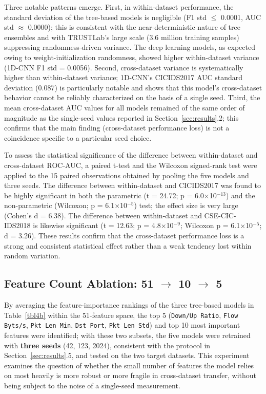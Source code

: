 \documentclass[a4paper,fleqn]{cas-sc}
\begin{document}
Three notable patterns emerge. First, in within-dataset performance, the standard deviation of the tree-based models is negligible (F1 std $\leq$ 0.0001, AUC std $\approx$ 0.0000); this is consistent with the near-deterministic nature of tree ensembles and with TRUSTLab's large scale (3.6 million training samples) suppressing randomness-driven variance. The deep learning models, as expected owing to weight-initialization randomness, showed higher within-dataset variance (1D-CNN F1 std = 0.0056). Second, cross-dataset variance is systematically higher than within-dataset variance; 1D-CNN's CICIDS2017 AUC standard deviation (0.087) is particularly notable and shows that this model's cross-dataset behavior cannot be reliably characterized on the basis of a single seed. Third, the mean cross-dataset AUC values for all models remained of the same order of magnitude as the single-seed values reported in Section~\ref{sec:results}.2; this confirms that the main finding (cross-dataset performance loss) is not a coincidence specific to a particular seed choice.

To assess the statistical significance of the difference between within-dataset and cross-dataset ROC-AUC, a paired t-test and the Wilcoxon signed-rank test were applied to the 15 paired observations obtained by pooling the five models and three seeds. The difference between within-dataset and CICIDS2017 was found to be highly significant in both the parametric (t = 24.72; p = 6.0$\times$10$^{-13}$) and the non-parametric (Wilcoxon; p = 6.1$\times$10$^{-5}$) test; the effect size is very large (Cohen's d = 6.38). The difference between within-dataset and CSE-CIC-IDS2018 is likewise significant (t = 12.63; p = 4.8$\times$10$^{-9}$; Wilcoxon p = 6.1$\times$10$^{-5}$; d = 3.26). These results confirm that the cross-dataset performance loss is a strong and consistent statistical effect rather than a weak tendency lost within random variation.

\FloatBarrier
\subsection{Feature Count Ablation: 51 $\rightarrow$ 10 $\rightarrow$ 5}

By averaging the feature-importance rankings of the three tree-based models in Table~\ref{tbl4b} within the 51-feature space, the top 5 (\texttt{Down/Up Ratio}, \texttt{Flow Byts/s}, \texttt{Pkt Len Min}, \texttt{Dst Port}, \texttt{Pkt Len Std}) and top 10 most important features were identified; with these two subsets, the five models were retrained with \textbf{three seeds} (42, 123, 2024), consistent with the protocol in Section~\ref{sec:results}.5, and tested on the two target datasets. This experiment examines the question of whether the small number of features the model relies on most heavily is more robust or more fragile in cross-dataset transfer, without being subject to the noise of a single-seed measurement.
\end{document}
